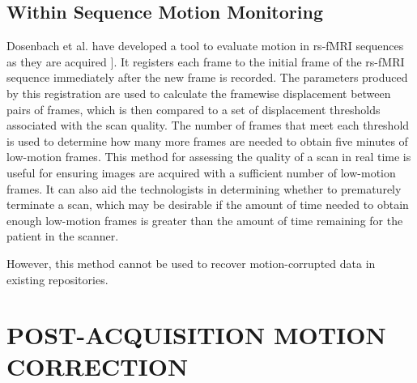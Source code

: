 \subsection{Within Sequence Motion Monitoring}

Dosenbach et al. have developed a tool to evaluate motion in rs-fMRI sequences as they are acquired ]\cite{Dosenbach2017}. It registers each frame to the initial frame of the rs-fMRI sequence immediately after the new frame is recorded. The parameters produced by this registration are used to calculate the framewise displacement between pairs of frames, which is then compared to a set of displacement thresholds associated with the scan quality. The number of frames that meet each threshold is used to determine how many more frames are needed to obtain five minutes of low-motion frames. This method for assessing the quality of a scan in real time is useful for ensuring images are acquired with a sufficient number of low-motion frames. It can also aid the technologists in determining whether to prematurely terminate a scan, which may be desirable if the amount of time needed to obtain enough low-motion frames is greater than the amount of time remaining for the patient in the scanner. 



However, this method cannot be used to recover motion-corrupted data in existing repositories.


\section{POST-ACQUISITION MOTION CORRECTION}


